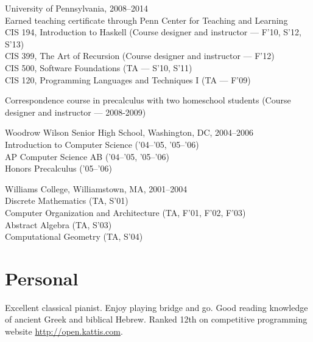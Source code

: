 \documentclass[12pt]{article}
\newcommand{\cvitem}{\par\hangpara{2em}{1}}
\begin{document}
\cvitem
University of Pennsylvania, 2008--2014 \\
Earned teaching certificate through Penn Center for Teaching and
Learning \\
CIS 194, Introduction to Haskell (Course designer and instructor ---
F'10, S'12, S'13) \\
CIS 399, The Art of Recursion (Course designer and instructor ---
F'12) \\
CIS 500, Software Foundations (TA --- S'10, S'11) \\
CIS 120, Programming Languages and Techniques I (TA --- F'09)

\cvitem
Correspondence course in precalculus with two homeschool students
(Course designer and instructor --- 2008-2009)

\cvitem
Woodrow Wilson Senior High School, Washington, DC, 2004--2006 \\
Introduction to Computer Science ('04--'05, '05--'06) \\
AP Computer Science AB ('04--'05, '05--'06) \\
Honors Precalculus ('05--'06)

\cvitem
Williams College, Williamstown, MA, 2001--2004 \\
Discrete Mathematics (TA, S'01) \\
Computer Organization and Architecture (TA, F'01, F'02, F'03) \\
Abstract Algebra (TA, S'03) \\
Computational Geometry (TA, S'04) \\




\section*{Personal}

Excellent classical pianist.  Enjoy playing bridge and go.  Good
reading knowledge of ancient Greek and biblical Hebrew.  Ranked 12th
on competitive programming website \url{http://open.kattis.com}.
\end{document}
